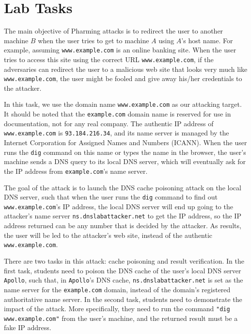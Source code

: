 \section{Lab Tasks}


The main objective of Pharming attacks is to redirect the user
to another machine $B$ when the user tries to get to machine $A$ using
$A$'s host name. For example, assuming {\tt www.example.com} is an online banking 
site.  When the user tries to access this site using the
correct URL {\tt www.example.com}, if the adversaries can redirect the user 
to a malicious web site that looks very much like 
{\tt www.example.com}, the user might be fooled and give away 
his/her credentials to the attacker. 

In this task, we use the domain name {\tt www.example.com}
as our attacking target. It should be noted that the {\tt example.com} 
domain name is reserved for use in documentation, not for 
any real company. The authentic IP address of {\tt www.example.com} is 
{\tt 93.184.216.34}, and its name server is managed by
the Internet Corporation for Assigned Names and Numbers (ICANN).
When the user runs the {\tt dig} command 
on this name or types the name in the browser, 
the user's machine sends a DNS query to its local DNS 
server, which will eventually ask for the IP address 
from {\tt example.com}'s name server. 


The goal of the attack is to launch the DNS cache poisoning attack
on the local DNS server, such that 
when the user runs the {\tt dig} command to find out {\tt
www.example.com}'s IP address, the local DNS server will end
up going to the attacker's name server {\tt ns.dnslabattacker.net} 
to get the IP address, so the IP address returned can be 
any number that is decided by the attacker. As results, the 
user will be led to the attacker's web site,
instead of the authentic {\tt www.example.com}.



There are two tasks in this attack: cache poisoning and result
verification.  In the first task, 
students need to poison the DNS cache of the user's local DNS server {\tt
Apollo}, such that, in {\tt Apollo}'s DNS cache,
{\tt ns.dnslabattacker.net} is set as the name server for 
the {\tt example.com} domain, instead of the domain's 
registered authoritative name server. 
In the second task, students need to demonstrate the impact of the attack.
More specifically, they need to run the command {\tt "dig
www.example.com"} from the user's machine, and the returned 
result must be a fake IP address. 




